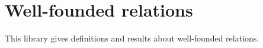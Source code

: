 \section{Well-founded relations}\label{Wellfounded}

This library gives definitions and results about well-founded relations.

